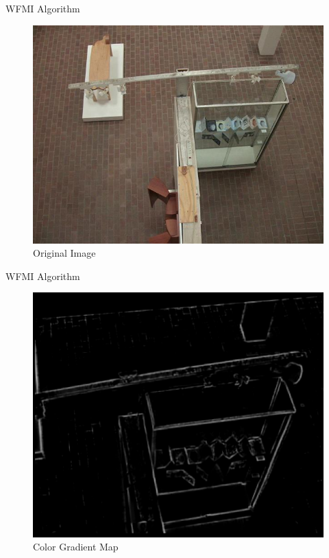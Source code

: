 \documentclass{beamer}
\begin{document}
\begin{frame}[c]{\sc WFMI Algorithm}

\begin{figure}[!h]
\centering
\includegraphics[height=.7\textheight]{AGS4L005}
\caption{Original Image}
\label{ArtGalleryOriginal}
\end{figure}

\end{frame}


\begin{frame}[c]{\sc WFMI Algorithm}

\begin{figure}[!h]
\centering
\includegraphics[height=.7\textheight]{ColorEdges}
\caption{Color Gradient Map \cite{Lee1991}}
\label{ArtGalleryGradient}
\end{figure}

\end{frame}
\end{document}
